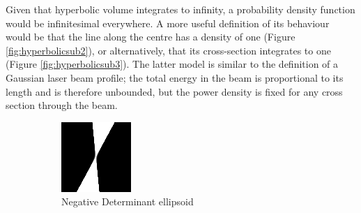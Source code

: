 \documentclass{article}
\begin{document}
        Given that hyperbolic volume integrates to infinity, a probability density function would be infinitesimal everywhere.  A more useful definition of its behaviour would be that the line along the centre has a density of one (Figure \ref{fig:hyperbolicsub2}), or alternatively, that its cross-section integrates to one (Figure \ref{fig:hyperbolicsub3}).
        The latter model is similar to the definition of a Gaussian laser beam profile; the total energy in the beam is proportional to its length and is therefore unbounded, but the power density is fixed for any cross section through the beam.
        \begin{figure}
        \centering
        \begin{subfigure}{.33\textwidth}
          \centering
          \includegraphics[width=.9\linewidth]{images/GaussianRay1.png}
          \caption{Negative Determinant ellipsoid}
          \label{fig:hyperbolicsub1}
        \end{subfigure}%
        \begin{subfigure}{.33\textwidth}
          \centering

\end{subfigure}
\end{figure}
\end{document}

